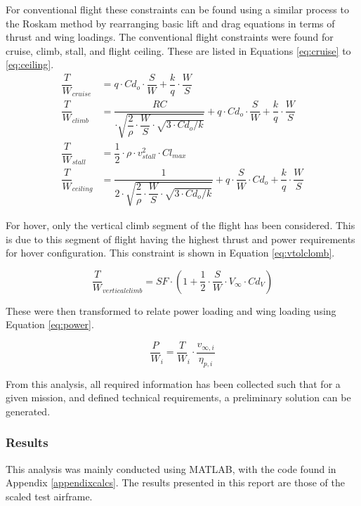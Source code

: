 For conventional flight these constraints can be found using a similar process to the Roskam method \cite{roskam1985airplane} by rearranging basic lift and drag equations in terms of thrust and wing loadings. The conventional flight constraints were found for cruise, climb, stall, and flight ceiling. These are listed in Equations \ref{eq:cruise} to \ref{eq:ceiling}.
\begin{align}
    \dfrac{T}{W}_{cruise} &= q \cdot Cd_o\cdot \dfrac{S}{W}+\dfrac{k}{q}\cdot \dfrac{W}{S} \label{eq:cruise}\\
    \dfrac{T}{W}_{climb} &=  \dfrac{RC}{\cdot \sqrt{\dfrac{2}{\rho}\cdot \dfrac{W}{S}\cdot \sqrt{3\cdot Cd_o/k}}} + q \cdot Cd_o\cdot \dfrac{S}{W}+\dfrac{k}{q}\cdot \dfrac{W}{S} \label{eq:climb}\\
    \dfrac{T}{W}_{stall} &= \dfrac{1}{2}\cdot \rho \cdot v_{stall}^2 \cdot Cl_{max} \label{eq:stall}\\
    \dfrac{T}{W}_{ceiling} &= \dfrac{1}{2\cdot \sqrt{\dfrac{2}{\rho}\cdot \dfrac{W}{S}\cdot \sqrt{3\cdot Cd_o/k}}} + q \cdot \dfrac{S}{W}\cdot Cd_o + \dfrac{k}{q}\cdot \dfrac{W}{S} \label{eq:ceiling}
\end{align}

For hover, only the vertical climb segment of the flight has been considered. This is due to this segment of flight having the highest thrust and power requirements for hover configuration. This constraint is shown in Equation \ref{eq:vtolclomb}.

\begin{equation}
        \dfrac{T}{W}_{vertical climb} = SF\cdot \left(
        1 + \dfrac{1}{2}\cdot \dfrac{S}{W}\cdot V_{\infty}\cdot Cd_{V}
        \right)
    \label{eq:vtolclomb}
\end{equation}

These were then transformed to relate power loading and wing loading using Equation \ref{eq:power}. 

\begin{equation}
        \dfrac{P}{W}_{i} = \dfrac{T}{W}_{i} \cdot \dfrac{v_{\infty, i}}{\eta_{p, i}}
    \label{eq:power}
\end{equation}

From this analysis, all required information has been collected such that for a given mission, and defined technical requirements, a preliminary solution can be generated. 
\subsubsection{Results}
This analysis was mainly conducted using MATLAB, with the code found in Appendix \ref{appendixcalcs}. The results presented in this report are those of the scaled test airframe. \\

